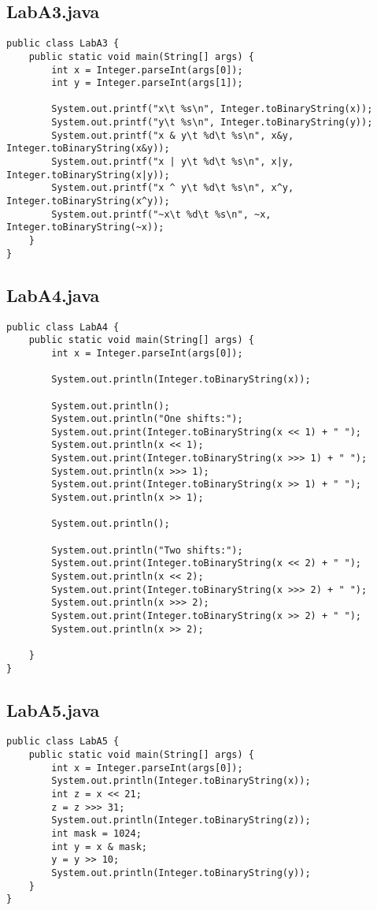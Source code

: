 \documentclass{article}
\begin{document}
\subsection{LabA3.java}
\begin{lstlisting}
public class LabA3 {
    public static void main(String[] args) {
        int x = Integer.parseInt(args[0]);
        int y = Integer.parseInt(args[1]);
        
        System.out.printf("x\t %s\n", Integer.toBinaryString(x));
        System.out.printf("y\t %s\n", Integer.toBinaryString(y));
        System.out.printf("x & y\t %d\t %s\n", x&y, Integer.toBinaryString(x&y));
        System.out.printf("x | y\t %d\t %s\n", x|y, Integer.toBinaryString(x|y));
        System.out.printf("x ^ y\t %d\t %s\n", x^y, Integer.toBinaryString(x^y));
        System.out.printf("~x\t %d\t %s\n", ~x, Integer.toBinaryString(~x));
    }
}
\end{lstlisting}
\pagebreak

\subsection{LabA4.java}
\begin{lstlisting}
public class LabA4 {
    public static void main(String[] args) {
        int x = Integer.parseInt(args[0]);
        
        System.out.println(Integer.toBinaryString(x));
        
        System.out.println();
        System.out.println("One shifts:");
        System.out.print(Integer.toBinaryString(x << 1) + " ");
        System.out.println(x << 1);
        System.out.print(Integer.toBinaryString(x >>> 1) + " ");
        System.out.println(x >>> 1);
        System.out.print(Integer.toBinaryString(x >> 1) + " ");
        System.out.println(x >> 1);

        System.out.println();
        
        System.out.println("Two shifts:");
        System.out.print(Integer.toBinaryString(x << 2) + " ");
        System.out.println(x << 2);
        System.out.print(Integer.toBinaryString(x >>> 2) + " ");
        System.out.println(x >>> 2);
        System.out.print(Integer.toBinaryString(x >> 2) + " ");
        System.out.println(x >> 2);

    }
}
\end{lstlisting}

\subsection{LabA5.java}
\begin{lstlisting}
public class LabA5 {
    public static void main(String[] args) {
        int x = Integer.parseInt(args[0]);
        System.out.println(Integer.toBinaryString(x));
        int z = x << 21;
        z = z >>> 31;
        System.out.println(Integer.toBinaryString(z));
        int mask = 1024;
        int y = x & mask;
        y = y >> 10;
        System.out.println(Integer.toBinaryString(y));
    }
} 
\end{lstlisting}
\end{document}
